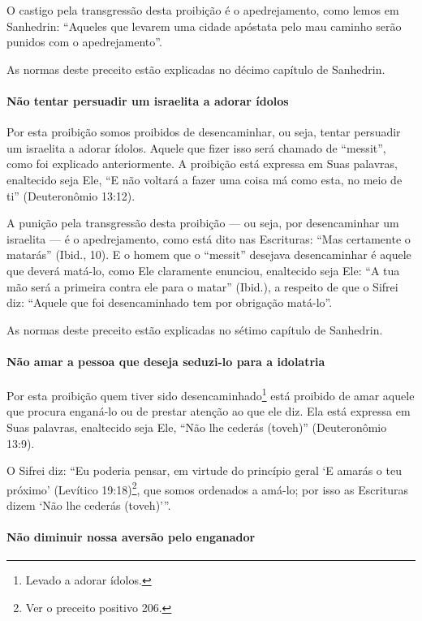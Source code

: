 O castigo pela transgressão desta proibição é o apedrejamento, como
lemos em Sanhedrin: ``Aqueles que levarem uma cidade apóstata pelo mau
caminho serão punidos com o apedrejamento''.

As normas deste preceito estão explicadas no décimo capítulo de Sanhedrin.

\paragraph{Não tentar persuadir um israelita a adorar ídolos}

Por esta proibição somos proibidos de desencaminhar, ou seja, tentar
persuadir um israelita a adorar ídolos. Aquele que fizer isso será
chamado de ``messit'', como foi explicado anteriormente. A proibição
está expressa em Suas palavras, enaltecido seja Ele, ``E não voltará a
fazer uma coisa má como esta, no meio de ti'' (Deuteronômio 13:12).

A punição pela transgressão desta proibição --- ou seja, por
desencaminhar um israelita --- é o apedrejamento, como está dito nas
Escrituras: ``Mas certamente o matarás'' (Ibid., 10). E o homem que o
``messit'' desejava desencaminhar é aquele que deverá matá-lo, como Ele
claramente enunciou, enaltecido seja Ele: ``A tua mão será a primeira
contra ele para o matar'' (Ibid.), a respeito de que o Sifrei diz:
``Aquele que foi desencaminhado tem por obrigação matá-lo''.

As normas deste preceito estão explicadas no sétimo capítulo de Sanhedrin.

\paragraph{Não amar a pessoa que deseja seduzi-lo para a idolatria}

Por esta proibição quem tiver sido desencaminhado\footnote{Levado a adorar ídolos.} está proibido
de amar aquele que procura enganá-lo ou de prestar atenção ao que ele
diz. Ela está expressa em Suas palavras, enaltecido seja Ele, ``Não lhe
cederás (toveh)'' (Deuteronômio 13:9).

O Sifrei diz: ``Eu poderia pensar, em virtude do princípio geral `E
amarás o teu próximo' (Levítico 19:18)\footnote{Ver o preceito positivo 206.}, que somos
ordenados a amá-lo; por isso as Escrituras dizem `Não lhe cederás
(toveh)'''.

\paragraph{Não diminuir nossa aversão pelo enganador}

